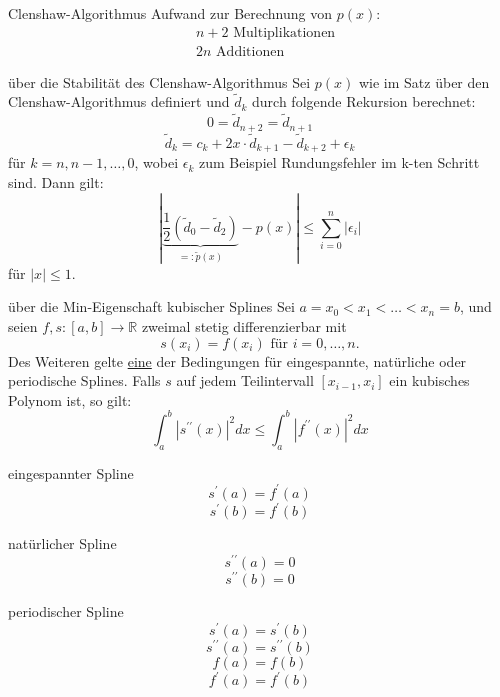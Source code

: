 \begin{flashcard}[Aufwand]{Clenshaw-Algorithmus}
Aufwand zur Berechnung von $p(x)$:
{\begin{align*}
	&n+2 \text{ Multiplikationen}\\
	&2n \text{ Additionen}
\end{align*}}
\end{flashcard}

\begin{flashcard}[Satz]{über die Stabilität des Clenshaw-Algorithmus}
Sei $p(x)$ wie im Satz über den Clenshaw-Algorithmus definiert und $\tilde{d}_k$ durch folgende Rekursion berechnet:
$$
	0 = \tilde{d}_{n+2} = \tilde{d}_{n+1}
$$
$$
	\tilde{d}_k = c_k + 2x \cdot \tilde{d}_{k+1} - \tilde{d}_{k+2} + \epsilon_k
$$
für $k = n,n-1, \ldots , 0$, wobei $\epsilon_k$ zum Beispiel Rundungsfehler im k-ten Schritt sind. Dann gilt:
$$
	| \underbrace{\frac{1}{2}(\tilde{d}_0 - \tilde{d}_2)}_{=:\tilde{p}(x)} - p(x) | \leq \sum_{i=0}^n |\epsilon_i|
$$
für $|x| \leq 1$.
\end{flashcard}

\begin{flashcard}[Satz]{über die Min-Eigenschaft kubischer Splines}
Sei $a = x_0 < x_1 < \ldots < x_n = b$, und seien $f,s: [a,b] \rightarrow \mathbb{R}$ zweimal stetig differenzierbar mit
$$
	s(x_i) = f(x_i) \text{ für } i= 0, \ldots , n.
$$
Des Weiteren gelte \underline{eine} der Bedingungen für eingespannte, natürliche oder periodische Splines.
Falls $s$ auf jedem Teilintervall $[x_{i-1}, x_i]$ ein kubisches Polynom ist, so gilt:
$$
	\int_a^b | s^{\prime\prime}(x) |^2dx \leq 	\int_a^b | f^{\prime\prime}(x) |^2dx
$$
\end{flashcard}

\begin{flashcard}[Definition]{eingespannter Spline}
$$
	s^\prime(a) = f^\prime(a)
$$
$$
	s^\prime(b) = f^\prime(b)
$$
\end{flashcard}

\begin{flashcard}[Definition]{natürlicher Spline}
$$
	s^{\prime\prime}(a) = 0
$$
$$
	s^{\prime\prime}(b) = 0
$$
\end{flashcard}

\begin{flashcard}[Definition]{periodischer Spline}
$$
	s^{\prime}(a) = s^{\prime}(b)
$$
$$
	s^{\prime\prime}(a) = s^{\prime\prime}(b)
$$
$$
	f(a) = f(b)
$$
$$
	f^{\prime}(a) = f^{\prime}(b)
$$
\end{flashcard}

